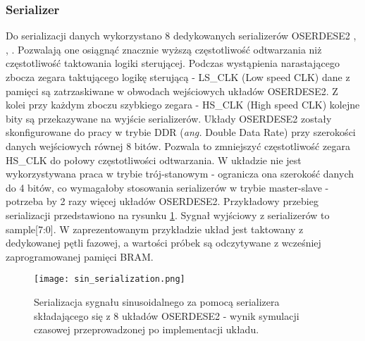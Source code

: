         \subsubsection{Serializer}
            Do serializacji danych wykorzystano 8 dedykowanych serializerów OSERDESE2 \cite{FPGA_SelectIO}, \cite{AMD_Lib_Guide}, 
            \cite{Zynq_7000_DC_AC} . Pozwalają one osiągnąć znacznie wyższą częstotliwość odtwarzania niż częstotliwość taktowania 
            logiki sterującej. Podczas wystąpienia narastającego zbocza zegara taktującego logikę sterującą - LS\_CLK (Low speed CLK) 
            dane z pamięci są zatrzaskiwane w obwodach wejściowych układów OSERDESE2. Z kolei przy każdym zboczu szybkiego zegara - 
            HS\_CLK (High speed CLK) kolejne bity są przekazywane na wyjście serializerów. Układy OSERDESE2 zostały skonfigurowane do 
            pracy w trybie DDR (\textit{ang.} Double Data Rate) przy szerokości danych wejściowych równej 8 bitów. 
            Pozwala to zmniejszyć częstotliwość zegara HS\_CLK do połowy częstotliwości odtwarzania. W układzie nie jest 
            wykorzystywana praca w trybie trój-stanowym - ogranicza ona szerokość danych do 4 bitów, co wymagałoby stosowania 
            serializerów w trybie master-slave - potrzeba by 2 razy więcej układów OSERDESE2. Przykładowy przebieg serializacji 
            przedstawiono na rysunku \ref{fig:serialization}. Sygnał wyjściowy z serializerów to sample[7:0]. W zaprezentowanym 
            przykładzie układ jest taktowany z dedykowanej pętli fazowej, a wartości próbek są odczytywane z wcześniej zaprogramowanej 
            pamięci BRAM. 
            \begin{figure}[!ht]
                \centering
                \texttt{[image: sin\_serialization.png]}
                \caption{Serializacja sygnału sinusoidalnego za pomocą serializera składającego się z 8 układów OSERDESE2 - wynik symulacji czasowej przeprowadzonej po implementacji układu.}
                \label{fig:serialization}
            \end{figure}

